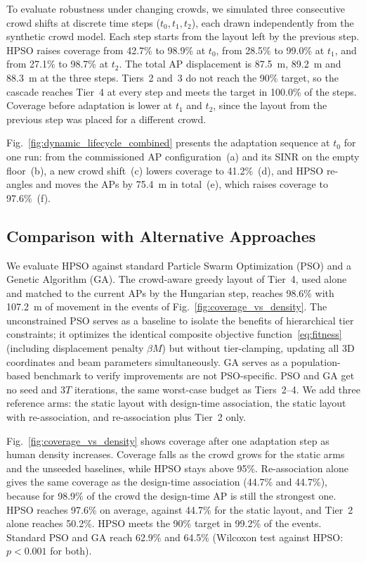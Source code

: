 \documentclass[conference]{IEEEtran}
\begin{document}
	To evaluate robustness under changing crowds, we simulated three consecutive crowd shifts at discrete time steps ($t_0, t_1, t_2$), each drawn independently from the synthetic crowd model. Each step starts from the layout left by the previous step. HPSO raises coverage from 42.7\% to 98.9\% at $t_0$, from 28.5\% to 99.0\% at $t_1$, and from 27.1\% to 98.7\% at $t_2$. The total AP displacement is 87.5~m, 89.2~m and 88.3~m at the three steps. Tiers~2 and~3 do not reach the 90\% target, so the cascade reaches Tier~4 at every step and meets the target in 100.0\% of the steps. Coverage before adaptation is lower at $t_1$ and $t_2$, since the layout from the previous step was placed for a different crowd.

	Fig.~\ref{fig:dynamic_lifecycle_combined} presents the adaptation sequence at $t_{0}$ for one run: from the commissioned AP configuration~(a) and its SINR on the empty floor~(b), a new crowd shift~(c) lowers coverage to 41.2\%~(d), and HPSO re-angles and moves the APs by 75.4~m in total~(e), which raises coverage to 97.6\%~(f).

	\subsection{Comparison with Alternative Approaches}

	We evaluate HPSO against standard Particle Swarm Optimization (PSO) and a Genetic Algorithm (GA). The crowd-aware greedy layout of Tier~4, used alone and matched to the current APs by the Hungarian step, reaches 98.6\% with 107.2~m of movement in the events of Fig.~\ref{fig:coverage_vs_density}. The unconstrained PSO serves as a baseline to isolate the benefits of hierarchical tier constraints; it optimizes the identical composite objective function~\eqref{eq:fitness} (including displacement penalty $\beta M$) but without tier-clamping, updating all 3D coordinates and beam parameters simultaneously. GA serves as a population-based benchmark to verify improvements are not PSO-specific. PSO and GA get no seed and $3T$ iterations, the same worst-case budget as Tiers~2--4. We add three reference arms: the static layout with design-time association, the static layout with re-association, and re-association plus Tier~2 only.

	Fig.~\ref{fig:coverage_vs_density} shows coverage after one adaptation step as human density increases. Coverage falls as the crowd grows for the static arms and the unseeded baselines, while HPSO stays above 95\%. Re-association alone gives the same coverage as the design-time association (44.7\% and 44.7\%), because for 98.9\% of the crowd the design-time AP is still the strongest one. HPSO reaches 97.6\% on average, against 44.7\% for the static layout, and Tier~2 alone reaches 50.2\%. HPSO meets the 90\% target in 99.2\% of the events. Standard PSO and GA reach 62.9\% and 64.5\% (Wilcoxon test against HPSO: $p <0.001$ for both).
\end{document}
